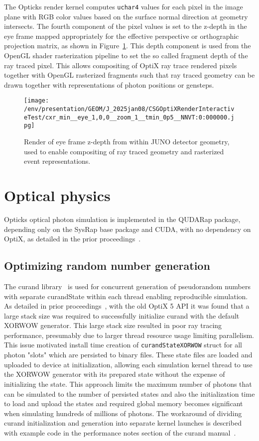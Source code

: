 \documentclass{webofc}
\begin{document}
The Opticks render kernel computes {\tt uchar4} values for each pixel in the image 
plane with RGB color values based on the surface normal direction at geometry intersects. 
The fourth component of the pixel values is set to the z-depth in the eye frame 
mapped appropriately for the effective perspective or orthographic projection matrix, 
as shown in Figure~\ref{depth}.  
This depth component is used from the OpenGL shader rasterization pipeline to set the 
so called fragment depth of the ray traced pixel. This allows compositing of OptiX ray 
trace rendered pixels together with OpenGL rasterized fragments such that 
ray traced geometry can be drawn together with representations of photon positions or gensteps.
%
%
\begin{figure}
\centering
\texttt{[image: /env/presentation/GEOM/J\_2025jan08/CSGOptiXRenderInteractiveTest/cxr\_min\_\_eye\_1,0,0\_\_zoom\_1\_\_tmin\_0p5\_\_NNVT:0:000000.jpg]}
\caption{Render of eye frame z-depth from within JUNO detector geometry, used to enable compositing of ray traced geometry and rasterized event representations.}  
\label{depth}
\vspace{-5mm}
\end{figure}%
%
% 
\section{Optical physics}%
%
Opticks optical photon simulation is implemented in the QUDARap package, 
depending only on the SysRap base package and CUDA, with no dependency on OptiX,
as detailed in the prior proceedings~\cite{chep2023}.
%
\subsection{Optimizing random number generation}
\label{optrng} 
%
The curand library~\cite{curand} is used for concurrent generation 
of pseudorandom numbers with separate curandState within each thread
enabling reproducible simulation.
As detailed in prior proceedings~\cite{chep2016}, with the old OptiX 5 API
it was found that a large stack size was required to successfully initialize curand
with the default XORWOW generator. This large stack size resulted in poor ray tracing 
performance, presumably due to larger thread resource usage limiting parallelism.  
This issue motivated install time creation of {\tt curandStateXORWOW} struct 
for all photon "slots" which are persisted to binary files.  
These state files are loaded and uploaded to device at initialization,  
allowing each simulation kernel thread to use the XORWOW generator with its 
prepared state without the expense of initializing the state. 
This approach limits the maximum number of photons 
that can be simulated to the number of persisted states and also the initialization time 
to load and upload the states and required global memory becomes significant when simulating 
hundreds of millions of photons. 
The workaround of dividing curand initialization and generation into 
separate kernel launches is described with example code in the performance notes 
section of the curand manual~\cite{curand}. 
\end{document}
